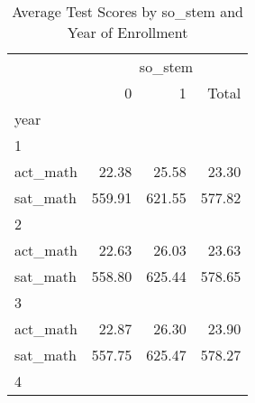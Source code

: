 \begin{table}[!h]
\caption{Average Test Scores by so\_stem and Year of Enrollment}
\centering
\begin{tabular}{llll}
\cline{1-4}
\multicolumn{1}{c}{} &
  \multicolumn{3}{|c}{so\_stem} \\
\multicolumn{1}{c}{} &
  \multicolumn{1}{|r}{0} &
  \multicolumn{1}{r}{1} &
  \multicolumn{1}{r}{Total} \\
\cline{1-4}
\multicolumn{1}{l}{year} &
  \multicolumn{1}{|r}{} &
  \multicolumn{1}{r}{} &
  \multicolumn{1}{r}{} \\
\multicolumn{1}{l}{\hspace{1em}1} &
  \multicolumn{1}{|r}{} &
  \multicolumn{1}{r}{} &
  \multicolumn{1}{r}{} \\
\multicolumn{1}{l}{\hspace{2em}act\_math} &
  \multicolumn{1}{|r}{22.38} &
  \multicolumn{1}{r}{25.58} &
  \multicolumn{1}{r}{23.30} \\
\multicolumn{1}{l}{\hspace{2em}sat\_math} &
  \multicolumn{1}{|r}{559.91} &
  \multicolumn{1}{r}{621.55} &
  \multicolumn{1}{r}{577.82} \\
\multicolumn{1}{l}{\hspace{1em}2} &
  \multicolumn{1}{|r}{} &
  \multicolumn{1}{r}{} &
  \multicolumn{1}{r}{} \\
\multicolumn{1}{l}{\hspace{2em}act\_math} &
  \multicolumn{1}{|r}{22.63} &
  \multicolumn{1}{r}{26.03} &
  \multicolumn{1}{r}{23.63} \\
\multicolumn{1}{l}{\hspace{2em}sat\_math} &
  \multicolumn{1}{|r}{558.80} &
  \multicolumn{1}{r}{625.44} &
  \multicolumn{1}{r}{578.65} \\
\multicolumn{1}{l}{\hspace{1em}3} &
  \multicolumn{1}{|r}{} &
  \multicolumn{1}{r}{} &
  \multicolumn{1}{r}{} \\
\multicolumn{1}{l}{\hspace{2em}act\_math} &
  \multicolumn{1}{|r}{22.87} &
  \multicolumn{1}{r}{26.30} &
  \multicolumn{1}{r}{23.90} \\
\multicolumn{1}{l}{\hspace{2em}sat\_math} &
  \multicolumn{1}{|r}{557.75} &
  \multicolumn{1}{r}{625.47} &
  \multicolumn{1}{r}{578.27} \\
\multicolumn{1}{l}{\hspace{1em}4} &
  \multicolumn{1}{|r}{} &
  \multicolumn{1}{r}{} &

\end{tabular}
\end{table}
